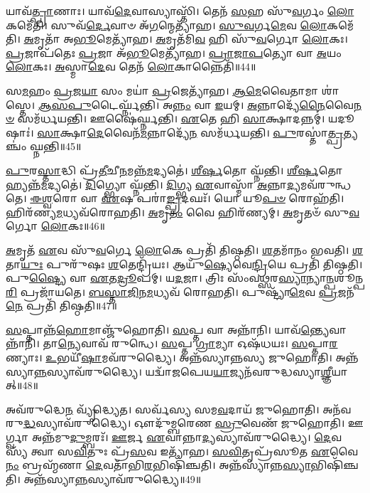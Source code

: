 𑌯𑌾𑌵᳴\-\ul{𑌤𑍍𑌪𑍍𑌰𑌾}\-𑌣𑌾𑌃।
𑌯𑌾𑌵᳴\-\ul{𑌦𑍇}\-𑌵𑌾𑌸𑍍𑌯𑌾𑌸𑍍𑌤𑌿᳴।
𑌤𑍇𑌨᳴ \ul{𑌸}\-𑌹 𑌸𑍁᳴\-\ul{𑌵}\-𑌰𑍍𑌗𑌂 \ul{𑌲𑍋}\-𑌕𑌮𑍇᳴𑌤𑌿।
𑌸𑍁𑌵᳴\-\ul{𑌰𑍍𑌦𑍇}\-𑌵𑌾𑍞 𑌅᳴\-\ul{𑌗}\-𑌨𑍍𑌮𑍇𑌤𑍍𑌯𑌾᳴𑌹।
\-\ul{𑌸𑍁}\-\-\ul{𑌵}\-𑌰𑍍𑌗\-\ul{𑌮𑍇}\-𑌵 \ul{𑌲𑍋}\-𑌕𑌮𑍇᳴𑌤𑌿।
\-\ul{𑌅}\-𑌮𑍃𑌤𑌾᳴ 𑌅\-\ul{𑌭𑍂}\-𑌮𑍇𑌤𑍍𑌯𑌾᳴𑌹।
\-\ul{𑌅}\-𑌮𑍃𑌤᳴𑌮𑌿\-\ul{𑌵} 𑌹𑌿 𑌸𑍁᳴\-\ul{𑌵}\-𑌰𑍍𑌗𑍋 \ul{𑌲𑍋}\-𑌕𑌃।
\-\ul{𑌪𑍍𑌰}\-𑌜𑌾𑌪᳴𑌤𑍇𑌃 \ul{𑌪𑍍𑌰}\-𑌜𑌾 𑌅᳴\-\ul{𑌭𑍂}\-𑌮𑍇𑌤𑍍𑌯𑌾᳴𑌹।
\-\ul{𑌪𑍍𑌰𑌾}\-\-\ul{𑌜𑌾}\-\-\ul{𑌪}\-𑌤𑍍𑌯𑍋 𑌵𑌾 \ul{𑌅}\-𑌯𑌂 \ul{𑌲𑍋}\-𑌕𑌃।
\-\ul{𑌅}\-𑌸𑍍𑌮𑌾\-\ul{𑌦𑍇}\-𑌵 𑌤𑍇𑌨᳴ \ul{𑌲𑍋}\-𑌕𑌾𑌨𑍍𑌨𑍈𑌤𑌿᳴॥44॥

𑌸\-\ul{𑌮}\-𑌹𑌂 \ul{𑌪𑍍𑌰}\-𑌜\-\ul{𑌯𑌾} 𑌸𑌂 𑌮𑌯𑌾॑ \ul{𑌪𑍍𑌰}\-𑌜𑍇𑌤𑍍𑌯𑌾᳴𑌹।
\-\ul{𑌆}\-\-\-\ul{𑌮𑍇}\-𑌵𑍈𑌤𑌾𑌮𑌾 𑌶𑌾॑𑌸𑍍𑌤𑍇।
\-\ul{𑌆}\-\-\ul{𑌸}\-\-\ul{𑌪𑍁}\-𑌟𑍈𑌰𑍍𑌘𑍍𑌨᳴𑌨𑍍𑌤𑌿।
𑌅\-\ul{𑌨𑍍𑌨𑌂} 𑌵𑌾 \ul{𑌇}\-𑌯𑌮𑍍।
\-\ul{𑌅}\-𑌨𑍍𑌨𑌾𑌦𑍍𑌯𑍇᳴\-\ul{𑌨𑍈}\-𑌵𑍈\-\ul{𑌨}\-\-\ul{𑍞} 𑌸𑌮᳴𑌰𑍍𑌧𑌯𑌨𑍍𑌤𑌿।
𑌊𑌷𑍈॑𑌰𑍍𑌘𑍍𑌨𑌨𑍍𑌤𑌿।
\-\ul{𑌏}\-𑌤𑍇 𑌹𑌿 \ul{𑌸𑌾}\-𑌕𑍍𑌷𑌾𑌦𑌨𑍍𑌨𑌮𑍍॑।
𑌯𑌦𑍂𑌷𑌾𑌃॑।
\-\ul{𑌸𑌾}\-𑌕𑍍𑌷𑌾\-\ul{𑌦𑍇}\-𑌵𑍈𑌨᳴\-\ul{𑌮}\-𑌨𑍍𑌨𑌾𑌦𑍍𑌯𑍇᳴\-\ul{𑌨} 𑌸𑌮᳴𑌰𑍍𑌧𑌯𑌨𑍍𑌤𑌿।
\-\ul{𑌪𑍁}\-𑌰𑌸𑍍𑌤𑌾॑\-\ul{𑌤𑍍𑌪𑍍𑌰}\-𑌤𑍍𑌯𑌞𑍍𑌚𑌂॑ 𑌘𑍍𑌨𑌨𑍍𑌤𑌿॥45॥

\-\ul{𑌪𑍁}\-𑌰\-\ul{𑌸𑍍𑌤𑌾}\-𑌦𑍍𑌧𑌿 𑌪𑍍𑌰᳴\-\ul{𑌤𑍀}\-𑌚𑍀\-\ul{𑌨}\-𑌮𑌨𑍍𑌨᳴\-\ul{𑌮}\-𑌦𑍍𑌯𑌤𑍇॑।
\-\ul{𑌶𑍀}\-\-\ul{𑌰𑍍}\-\-\ul{𑌷}\-𑌤𑍋 𑌘𑍍𑌨᳴𑌨𑍍𑌤𑌿।
\-\ul{𑌶𑍀}\-\-\ul{𑌰𑍍}\-\-\ul{𑌷}\-𑌤𑍋 𑌹𑍍𑌯𑌨𑍍𑌨᳴\-\ul{𑌮}\-𑌦𑍍𑌯𑌤𑍇॑।
\-\ul{𑌦𑌿}\-𑌗𑍍𑌭𑍍𑌯𑍋 𑌘𑍍𑌨᳴𑌨𑍍𑌤𑌿।
\-\ul{𑌦𑌿}\-𑌗𑍍𑌭𑍍𑌯 \ul{𑌏}\-𑌵𑌾𑌸𑍍𑌮𑌾᳴ \ul{𑌅}\-𑌨𑍍𑌨𑌾\-\ul{𑌦𑍍𑌯}\-𑌮𑌵᳴𑌰𑍁𑌨𑍍𑌧𑌤𑍇।
\-\ul{𑌈}\-\-\ul{𑌶𑍍𑌵}\-𑌰𑍋 𑌵𑌾 \ul{𑌏}\-𑌷 𑌪𑌰𑌾॑\-\ul{𑌙𑍍𑌪𑍍𑌰}\-𑌦𑌘𑌃᳴।
𑌯𑍋 𑌯𑍂\-\ul{𑌪}\-\-\ul{𑍞} 𑌰𑍋𑌹᳴𑌤𑌿।
𑌹𑌿𑌰᳴𑌣𑍍𑌯\-\ul{𑌮}\-𑌧𑍍𑌯𑌵᳴𑌰𑍋𑌹𑌤𑌿।
\-\ul{𑌅}\-𑌮𑍃\-\ul{𑌤𑌂} 𑌵𑍈 𑌹𑌿𑌰᳴𑌣𑍍𑌯𑌮𑍍।
\-\ul{𑌅}\-𑌮𑍃𑌤𑍞᳴ 𑌸𑍁\-\ul{𑌵}\-𑌰𑍍𑌗𑍋 \ul{𑌲𑍋}\-𑌕𑌃॥46॥

\-\ul{𑌅}\-𑌮𑍃𑌤᳴ \ul{𑌏}\-𑌵 𑌸𑍁᳴\-\ul{𑌵}\-𑌰𑍍𑌗𑍇 \ul{𑌲𑍋}\-𑌕𑍇 𑌪𑍍𑌰𑌤𑌿᳴ 𑌤𑌿𑌷𑍍𑌠𑌤𑌿।
\-\ul{𑌶}\-𑌤𑌮𑌾᳴𑌨𑌂 𑌭𑌵𑌤𑌿।
\-\ul{𑌶}\-𑌤𑌾\-\ul{𑌯𑍁𑌃} 𑌪𑍁𑌰𑍁᳴𑌷𑌃 \ul{𑌶}\-𑌤𑍇𑌨𑍍𑌦𑍍𑌰𑌿᳴𑌯𑌃।
𑌆𑌯𑍁᳴\-\ul{𑌷𑍍𑌯𑍇}\-𑌵𑍇\-\ul{𑌨𑍍𑌦𑍍𑌰𑌿}\-𑌯𑍇 𑌪𑍍𑌰𑌤𑌿᳴ 𑌤𑌿𑌷𑍍𑌠𑌤𑌿।
𑌪𑍁\-\ul{𑌷𑍍𑌟𑍍𑌯𑍈} 𑌵𑌾 \ul{𑌏}\-𑌤\-\ul{𑌦𑍍𑌰𑍂}\-𑌪𑌮𑍍।
𑌯\-\ul{𑌦}\-𑌜𑌾।
𑌤𑍍𑌰𑌿𑌃 𑌸𑌂᳴𑌵\-\ul{𑌥𑍍𑌸}\-𑌰\-\ul{𑌸𑍍𑌯𑌾}\-𑌨𑍍𑌯𑌾\-\ul{𑌨𑍍𑌪}\-𑌶𑍂𑌨𑍍𑌪\-\ul{𑌰𑌿} 𑌪𑍍𑌰𑌜𑌾᳴𑌯𑌤𑍇।
\-\ul{𑌬}\-\-\ul{𑌸𑍍𑌤𑌾}\-\-\ul{𑌜𑌿}\-𑌨\-\ul{𑌮}\-𑌧𑍍𑌯𑌵᳴ 𑌰𑍋𑌹𑌤𑌿।
𑌪𑍁𑌷𑍍𑌟𑍍𑌯𑌾᳴\-\ul{𑌮𑍇}\-𑌵 \ul{𑌪𑍍𑌰}\-𑌜𑌨᳴\-\ul{𑌨𑍇} 𑌪𑍍𑌰𑌤𑌿᳴ 𑌤𑌿𑌷𑍍𑌠𑌤𑌿॥47॥\anuvakamend[\-\ul{𑌪}\-\-\ul{𑌰𑌿}\-\-\ul{𑌧𑌾}\-𑌪𑌯᳴𑌤𑌿 \ul{𑌗𑍋}\-𑌧𑍂𑌮𑌾᳴ 𑌜𑍁𑌹𑍋\-\ul{𑌤𑌿} 𑌸𑍍𑌵𑌂 𑌨𑍈𑌤𑌿᳴ \ul{𑌪𑍍𑌰}\-𑌤𑍍𑌯𑌞𑍍𑌚𑌂॑ 𑌘𑍍𑌨𑌨𑍍𑌤𑌿 \ul{𑌲𑍋}\-𑌕𑍋 𑌨𑌵᳴ 𑌚]

\-\ul{𑌸}\-𑌪𑍍𑌤𑌾𑌨𑍍𑌨᳴\-\ul{𑌹𑍋}\-𑌮𑌾𑌞𑍍𑌜𑍁᳴𑌹𑍋𑌤𑌿।
\-\ul{𑌸}\-𑌪𑍍𑌤 𑌵𑌾 𑌅𑌨𑍍𑌨𑌾᳴𑌨𑌿।
𑌯𑌾𑌵᳴\-\ul{𑌨𑍍𑌤𑍍𑌯𑍇}\-𑌵𑌾𑌨𑍍𑌨𑌾᳴𑌨𑌿।
𑌤𑌾\-\ul{𑌨𑍍𑌯𑍇}\-𑌵𑌾𑌵᳴ 𑌰𑍁𑌨𑍍𑌧𑍇।
\-\ul{𑌸}\-𑌪𑍍𑌤 \ul{𑌗𑍍𑌰𑌾}\-𑌮𑍍𑌯𑌾 𑌓𑌷᳴𑌧𑌯𑌃।
\-\ul{𑌸}\-𑌪𑍍𑌤𑌾\-\ul{𑌰}\-𑌣𑍍𑌯𑌾𑌃।
\-\ul{𑌉}\-𑌭𑌯𑍀᳴\-\ul{𑌷𑌾}\-𑌮𑌵᳴𑌰𑍁𑌦𑍍𑌧𑍍𑌯𑍈।
𑌅𑌨𑍍𑌨᳴𑌸𑍍𑌯𑌾𑌨𑍍𑌨𑌸𑍍𑌯 𑌜𑍁𑌹𑍋𑌤𑌿।
𑌅𑌨𑍍𑌨᳴𑌸𑍍𑌯𑌾\-\ul{𑌨𑍍𑌨}\-𑌸𑍍𑌯𑌾\-𑌵᳴𑌰𑍁𑌦𑍍𑌧𑍍𑌯𑍈।
𑌯𑌦𑍍𑌵𑌾᳴𑌜𑌪𑍇𑌯\-\ul{𑌯𑌾}\-𑌜𑍍𑌯𑌨᳴𑌵𑌰𑍁𑌦𑍍𑌧𑌸𑍍𑌯𑌾\-\ul{𑌶𑍍𑌞𑍀}\-𑌯𑌾𑌤𑍍॥48॥

𑌅𑌵᳴𑌰𑍁𑌦𑍍𑌧𑍇\-\ul{𑌨} 𑌵𑍍𑌯𑍃᳴𑌦𑍍𑌧𑍍𑌯𑍇𑌤।
𑌸𑌰𑍍𑌵᳴𑌸𑍍𑌯 𑌸𑌮\-\ul{𑌵}\-𑌦𑌾𑌯᳴ 𑌜𑍁𑌹𑍋𑌤𑌿।
𑌅𑌨᳴𑌵𑌰𑍁\-\ul{𑌦𑍍𑌧}\-𑌸𑍍𑌯𑌾𑌵᳴𑌰𑍁𑌦𑍍𑌧𑍍𑌯𑍈।
𑌔𑌦𑍁᳴𑌮𑍍𑌬𑌰𑍇𑌣 \ul{𑌸𑍍𑌰𑍁}\-𑌵𑍇𑌣᳴ 𑌜𑍁𑌹𑍋𑌤𑌿।
𑌊𑌰𑍍𑌗𑍍𑌵𑌾 𑌅𑌨𑍍𑌨᳴𑌮𑍁\-\ul{𑌦𑍁}\-𑌮𑍍𑌬𑌰𑌃᳴।
\-\ul{𑌊}\-𑌰𑍍𑌜 \ul{𑌏}\-𑌵𑌾𑌨𑍍𑌨𑌾\-\ul{𑌦𑍍𑌯}\-𑌸𑍍𑌯𑌾𑌵᳴𑌰𑍁𑌦𑍍𑌧𑍍𑌯𑍈।
\-\ul{𑌦𑍇}\-𑌵𑌸𑍍𑌯᳴ 𑌤𑍍𑌵𑌾 𑌸\-\ul{𑌵𑌿}\-𑌤𑍁𑌃 𑌪𑍍𑌰᳴\-\ul{𑌸}\-𑌵 𑌇𑌤𑍍𑌯𑌾᳴𑌹।
\-\ul{𑌸}\-\-\ul{𑌵𑌿}\-𑌤𑍃𑌪𑍍𑌰᳴𑌸𑍂𑌤 \ul{𑌏}\-𑌵𑍈\-\ul{𑌨𑌂} 𑌬𑍍𑌰𑌹𑍍𑌮᳴𑌣𑌾 \ul{𑌦𑍇}\-𑌵𑌤𑌾᳴𑌭𑌿\-\ul{𑌰}\-𑌭𑌿𑌷𑌿᳴𑌞𑍍𑌚𑌤𑌿।
𑌅𑌨𑍍𑌨᳴𑌸𑍍𑌯𑌾𑌨𑍍𑌨\-\ul{𑌸𑍍𑌯𑌾}\-𑌭𑌿𑌷𑌿᳴𑌞𑍍𑌚𑌤𑌿।
𑌅𑌨𑍍𑌨᳴𑌸𑍍𑌯𑌾\-\ul{𑌨𑍍𑌨}\-𑌸𑍍𑌯𑌾𑌵᳴𑌰𑍁𑌦𑍍𑌧𑍍𑌯𑍈॥49॥

